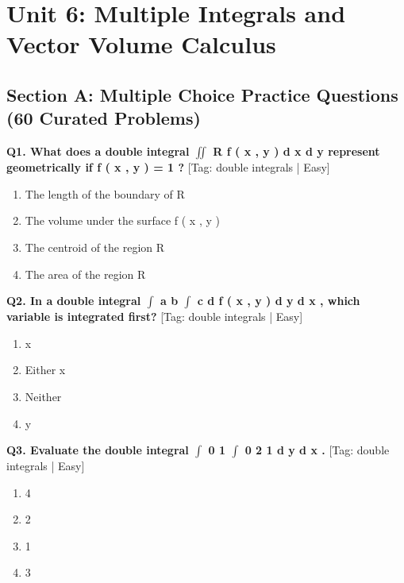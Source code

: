 \chapter{Unit 6: Multiple Integrals and Vector Volume Calculus}

\section{Section A: Multiple Choice Practice Questions (60 Curated Problems)}

\noindent\textbf{Q1. What does a double integral $\iint$ R f ( x , y ) d x d y represent geometrically if f ( x , y ) = 1 ?} \hfill [Tag: double integrals | Easy]
\begin{enumerate}[label=(\alph*),topsep=2pt,itemsep=1pt,partopsep=0pt,parsep=0pt]
    \item {{The length of the boundary of R}}
    \item {{The volume under the surface f ( x , y )}}
    \item {{The centroid of the region R}}
    \item {{The area of the region R}}
\end{enumerate}
\vspace{2mm}

\noindent\textbf{Q2. In a double integral $\int$ a b $\int$ c d f ( x , y ) d y d x , which variable is integrated first?} \hfill [Tag: double integrals | Easy]
\begin{enumerate}[label=(\alph*),topsep=2pt,itemsep=1pt,partopsep=0pt,parsep=0pt]
    \item {{x}}
    \item {{Either x}}
    \item {{Neither}}
    \item {{y}}
\end{enumerate}
\vspace{2mm}

\noindent\textbf{Q3. Evaluate the double integral $\int$ 0 1 $\int$ 0 2 1 d y d x .} \hfill [Tag: double integrals | Easy]
\begin{enumerate}[label=(\alph*),topsep=2pt,itemsep=1pt,partopsep=0pt,parsep=0pt]
    \item {{4}}
    \item {{2}}
    \item {{1}}
    \item {{3}}
\end{enumerate}
\vspace{2mm}

